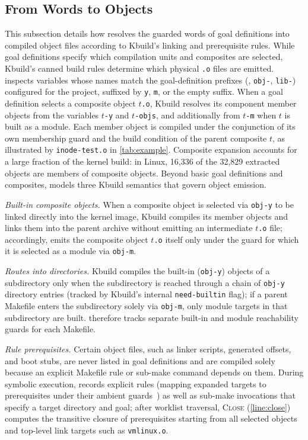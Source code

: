 \documentclass[acmsmall,screen,review,anonymous,nonacm]{acmart}
\begin{document}
  \subsection{From Words to Objects}\label{sec:approach:objects}
  This subsection details how \tool{} resolves the guarded words of goal definitions into compiled object files according to Kbuild's linking and prerequisite rules.
  While goal definitions specify which compilation units and composites are selected, Kbuild's canned build rules determine which physical \texttt{.o} files are emitted.
  \tool{} inspects variables whose names match the goal-definition prefixes (\eg, \texttt{obj-}, \texttt{lib-}) configured for the project, suffixed by \texttt{y}, \texttt{m}, or the empty suffix.
  When a goal definition selects a composite object $t$\texttt{.o}, Kbuild resolves its component member objects from the variables $t$\texttt{-y} and $t$\texttt{-objs}, and additionally from $t$\texttt{-m} when $t$ is built as a module.
  Each member object is compiled under the conjunction of its own membership guard and the build condition of the parent composite $t$, as illustrated by \texttt{inode-test.o} in \autoref{tab:example}.
  Composite expansion accounts for a large fraction of the kernel build: in Linux, 16,336 of the 32,829 extracted objects are members of composite objects.
  Beyond basic goal definitions and composites, \tool{} models three Kbuild semantics that govern object emission.

  \emph{Built-in composite objects.}
  When a composite object is selected via \texttt{obj-y} to be linked directly into the kernel image, Kbuild compiles its member objects and links them into the parent archive without emitting an intermediate $t$\texttt{.o} file; accordingly, \tool{} emits the composite object $t$\texttt{.o} itself only under the guard for which it is selected as a module via \texttt{obj-m}.

  \emph{Routes into directories.}
  Kbuild compiles the built-in (\texttt{obj-y}) objects of a subdirectory only when the subdirectory is reached through a chain of \texttt{obj-y} directory entries (tracked by Kbuild's internal \texttt{need-builtin} flag); if a parent Makefile enters the subdirectory solely via \texttt{obj-m}, only module targets in that subdirectory are built.
  \tool{} therefore tracks separate built-in and module reachability guards for each Makefile.

  \emph{Rule prerequisites.}
  Certain object files, such as linker scripts, generated offsets, and boot stubs, are never listed in goal definitions and are compiled solely because an explicit Makefile rule or sub-make command depends on them.
  During symbolic execution, \tool{} records explicit rules (mapping expanded targets to prerequisites under their ambient guards~\cite{gazzillo2017kmax,tamrawi2012symmake}) as well as sub-make invocations that specify a target directory and goal; after worklist traversal, \textsc{Close} (\autoref{line:close}) computes the transitive closure of prerequisites starting from all selected objects and top-level link targets such as \texttt{vmlinux.o}.
\end{document}
